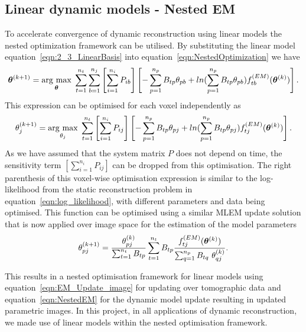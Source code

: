 \subsection{Linear dynamic models - Nested EM}
To accelerate convergence of dynamic reconstruction using linear models the nested optimization framework can be utilised. By substituting the linear model equation~\ref{eqn:2_3_LinearBasis} into equation~\ref{eqn:NestedOptimization} we have
\begin{equation}
\bm{\theta}^{(k+1)} = 
\underset{\bm{\theta}}{\operatorname{arg}\,\operatorname{max}}\;
\sum_{t=1}^{n_t} \sum_{b=1}^{n_j} \left[ \sum_{i=1}^{n_i}  P_{ib} \right]
\left[ 
-\sum_{p=1}^{n_p} B_{tp} \theta_{pb} + 
ln( \sum_{p=1}^{n_p} B_{tp} \theta_{pb}) 
f_{tb}^{(EM)}(\bm{\theta}^{(k)})
\right] \\ .
\end{equation}
This expression can be optimised for each voxel independently as
\begin{equation}
{\theta}_{j}^{(k+1)} = 
\underset{\theta_{j}}{\operatorname{arg}\,\operatorname{max}}\;
\sum_{t=1}^{n_t} \left[ \sum_{i=1}^{n_i}  P_{ij} \right]
\left[ 
-\sum_{p=1}^{n_p} B_{tp} \theta_{pj} + 
ln( \sum_{p=1}^{n_p} B_{tp} \theta_{pj}) 
f_{tj}^{(EM)}(\bm{\theta}^{(k)})
\right] \\ .
\end{equation}
As we have assumed that the system matrix $P$ does not depend on time, the sensitivity term $\left[ \sum_{i=1}^{n_i}  P_{ij} \right]$ can be dropped from this optimisation. The right parenthesis of this voxel-wise optimisation expression is similar to the log-likelihood from the static reconstruction problem in equation~\ref{eqn:log_likelihood}, with different parameters and data being optimised. This function can be optimised using a similar MLEM update solution that is now applied over image space for the estimation of the model parameters 
\begin{equation}
\theta_{pj}^{(k+1)} = \frac{\theta_{pj}^{(k)}}
{\sum_{t=1}^{n_t} B_{tp}} 
\sum_{t=1}^{n_t} B_{tp} 
\frac{f_{tj}^{(EM)}(\bm{\theta}^{(k)})}{\sum_{q=1}^{n_p} B_{tq}\ \theta_{qj}^{(k)} } \\.
\label{eqn:NestedEM}
\end{equation}

This results in a nested optimisation framework for linear models using equation~\ref{eqn:EM_Update_image} for updating over tomographic data and equation~\ref{eqn:NestedEM} for the dynamic model update resulting in updated parametric images. 
In this project, in all applications of dynamic reconstruction, we made use of linear models within the nested optimisation framework.